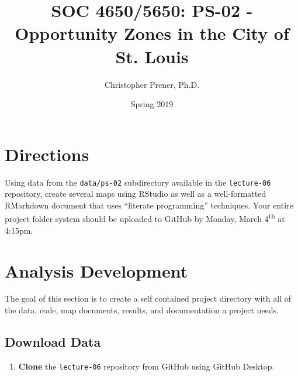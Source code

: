 \documentclass{tufte-handout}
\title{SOC 4650/5650: PS-02 - Opportunity Zones in the City of St. Louis}
\author{Christopher Prener, Ph.D.}
\date{Spring 2019}
\begin{document}
\maketitle %

\vspace{5mm}
\section{Directions}
Using data from the \texttt{data/ps-02} subdirectory available in the \texttt{lecture-06} repository, create several maps using RStudio as well as a well-formatted RMarkdown document that uses ``literate programming'' techniques. Your entire project folder system should be uploaded to GitHub by Monday, March 4\textsuperscript{th} at 4:15pm.

\vspace{5mm}
\section{Analysis Development}
The goal of this section is to create a self contained project directory with all of the data, code, map documents, results, and documentation a project needs.

\vspace{3mm}
\subsection{Download Data}
\begin{enumerate}[label=\alph*.]
\item \textbf{Clone} the \texttt{lecture-06} repository from GitHub using GitHub Desktop.
\end{enumerate}

\vspace{3mm}
\end{document}
